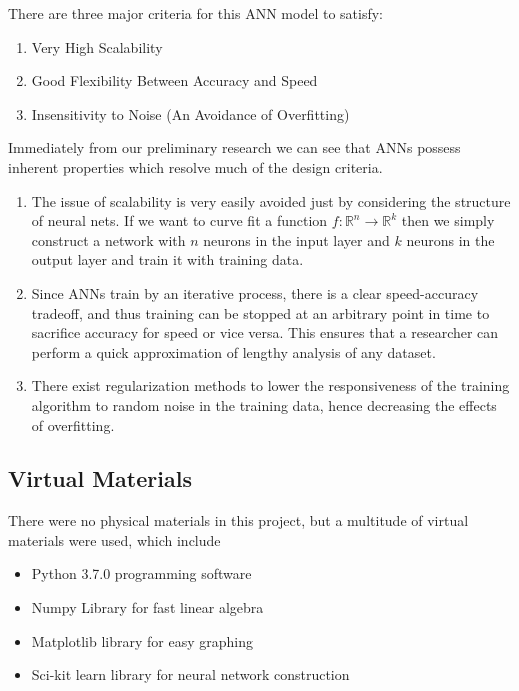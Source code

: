 \documentclass{article}
\begin{document}
There are three major criteria for this ANN model to satisfy:

\begin{enumerate}
    \item Very High Scalability
    \item Good Flexibility Between Accuracy and Speed
    \item Insensitivity to Noise (An Avoidance of Overfitting)
\end{enumerate}

Immediately from our preliminary research we can see that ANNs possess inherent properties which resolve much of the design criteria.

\begin{enumerate}
    \item The issue of scalability is very easily avoided just by considering the structure of neural nets. If we want to curve fit a function $f: \mathbb{R}^n \rightarrow \mathbb{R}^k$ then we simply construct a network with $n$ neurons in the input layer and $k$ neurons in the output layer and train it with training data.
    \item Since ANNs train by an iterative process, there is a clear speed-accuracy tradeoff, and thus training can be stopped at an arbitrary point in time to sacrifice accuracy for speed or vice versa. This ensures that a researcher can perform a quick approximation of lengthy analysis of any dataset.
    \item There exist regularization methods to lower the responsiveness of the training algorithm to random noise in the training data, hence decreasing the effects of overfitting.
\end{enumerate}

\subsection{Virtual Materials}

There were no physical materials in this project, but a multitude of virtual materials were used, which include

\begin{itemize}
    \item Python 3.7.0 programming software
    \item Numpy Library for fast linear algebra
    \item Matplotlib library for easy graphing
    \item Sci-kit learn library for neural network construction
\end{itemize}
\end{document}
